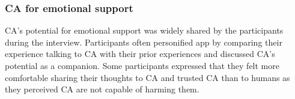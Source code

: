             




        
    \subsubsection{\ac{CA} for emotional support}
            \ac{CA}'s potential for emotional support was widely shared by the participants during the interview. Participants often personified \acl{app} by comparing their experience talking to \ac{CA} with their prior experiences and discussed \ac{CA}'s potential as a companion. 
            Some participants expressed that they felt more comfortable sharing their thoughts to \ac{CA} and trusted \ac{CA} than to humans as they perceived \ac{CA} are not capable of harming them.

